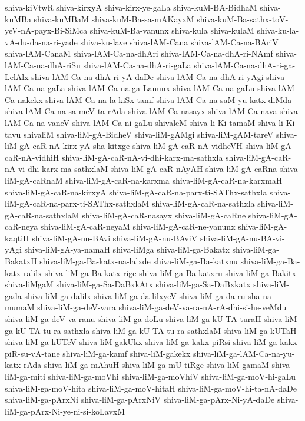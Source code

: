 {shiva-kiVtwR
shiva-kirxyA
shiva-kirx-ye-gaLa
shiva-kuM-BA-BidhaM
shiva-kuMBa
shiva-kuMBaM
shiva-kuM-Ba-sa-mAKayxM
shiva-kuM-Ba-sathx-toV-yeV-nA-payx-Bi-SiMca
shiva-kuM-Ba-vanunx
shiva-kula
shiva-kulaM
shiva-ku-la-vA-du-da-na-ri-yade
shiva-ku-lave
shiva-lAM-Cana
shiva-lAM-Ca-na-BAriV
shiva-lAM-CanaM
shiva-lAM-Ca-na-dhAri
shiva-lAM-Ca-na-dhA-ri-NAmf
shiva-lAM-Ca-na-dhA-riSu
shiva-lAM-Ca-na-dhA-ri-gaLa
shiva-lAM-Ca-na-dhA-ri-ga-LelAlx
shiva-lAM-Ca-na-dhA-ri-yA-daDe
shiva-lAM-Ca-na-dhA-ri-yAgi
shiva-lAM-Ca-na-gaLa
shiva-lAM-Ca-na-ga-Lanunx
shiva-lAM-Ca-na-gaLu
shiva-lAM-Ca-nakekx
shiva-lAM-Ca-na-la-kiSx-tamf
shiva-lAM-Ca-na-saM-yu-katx-diMda
shiva-lAM-Ca-na-sa-meV-ta-rAda
shiva-lAM-Ca-nasayx
shiva-lAM-Ca-nava
shiva-lAM-Ca-na-vaneV
shiva-lAM-Ca-ni-gaLu
shivaleM
shiva-li-Ki-tamaM
shiva-li-Ki-tavu
shivaliM
shiva-liM-gA-BidheV
shiva-liM-gAMgi
shiva-liM-gAM-tareV
shiva-liM-gA-caR-nA-kirx-yA-sha-kitxge
shiva-liM-gA-caR-nA-vidheVH
shiva-liM-gA-caR-nA-vidhiH
shiva-liM-gA-caR-nA-vi-dhi-karx-ma-sathxla
shiva-liM-gA-caR-nA-vi-dhi-karx-ma-sathxlaM
shiva-liM-gA-caR-nAyAH
shiva-liM-gA-caRna
shiva-liM-gA-caRnaM
shiva-liM-gA-caR-na-karxma
shiva-liM-gA-caR-na-karxmaH
shiva-liM-gA-caR-na-kirxyA
shiva-liM-gA-caR-na-parx-ti-SAThx-sathxla
shiva-liM-gA-caR-na-parx-ti-SAThx-sathxlaM
shiva-liM-gA-caR-na-sathxla
shiva-liM-gA-caR-na-sathxlaM
shiva-liM-gA-caR-nasayx
shiva-liM-gA-caRne
shiva-liM-gA-caR-neya
shiva-liM-gA-caR-neyaM
shiva-liM-gA-caR-ne-yanunx
shiva-liM-gA-kaqtiH
shiva-liM-gA-nu-BAvi
shiva-liM-gA-nu-BAviV
shiva-liM-gA-nu-BA-vi-yAgi
shiva-liM-gA-ya-namaH
shiva-liMga
shiva-liM-ga-Bakatx
shiva-liM-ga-BakatxH
shiva-liM-ga-Ba-katx-na-lalxde
shiva-liM-ga-Ba-katxnu
shiva-liM-ga-Ba-katx-ralilx
shiva-liM-ga-Ba-katx-rige
shiva-liM-ga-Ba-katxru
shiva-liM-ga-Bakitx
shiva-liMgaM
shiva-liM-ga-Sa-DaBxkAtx
shiva-liM-ga-Sa-DaBxkatx
shiva-liM-gada
shiva-liM-ga-dalilx
shiva-liM-ga-da-lilxyeV
shiva-liM-ga-da-ru-sha-na-mumaM
shiva-liM-ga-deV-vara
shiva-liM-ga-deV-va-ra-nA-rA-dhi-si-he-veMdu
shiva-liM-ga-deV-va-ranu
shiva-liM-ga-doLu
shiva-liM-ga-kU-TA-turaH
shiva-liM-ga-kU-TA-tu-ra-sathxla
shiva-liM-ga-kU-TA-tu-ra-sathxlaM
shiva-liM-ga-kUTaH
shiva-liM-ga-kUTeV
shiva-liM-gakUkx
shiva-liM-ga-kakx-piRsi
shiva-liM-ga-kakx-piR-su-vA-tane
shiva-liM-ga-kamf
shiva-liM-gakekx
shiva-liM-ga-lAM-Ca-na-yu-katx-rAda
shiva-liM-ga-mAhuH
shiva-liM-ga-mU-tiRge
shiva-liM-gamaM
shiva-liM-ga-miti
shiva-liM-ga-moVhi
shiva-liM-ga-moVhiV
shiva-liM-ga-moV-hi-gaLu
shiva-liM-ga-moV-hita
shiva-liM-ga-moV-hitaH
shiva-liM-ga-moV-hi-ta-nA-daDe
shiva-liM-ga-pArxNi
shiva-liM-ga-pArxNiV
shiva-liM-ga-pArx-Ni-yA-daDe
shiva-liM-ga-pArx-Ni-ye-ni-si-koLavxM
}
